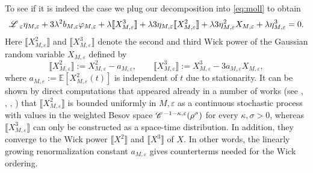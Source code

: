 \documentclass[a4paper,11pt]{article}
\newcommand{\assign}{:=}
\numberwithin{equation}{section}
\newcommand{\LL}{\mathscr{L} \hspace{.2em}}
\begin{document}
To see if it is indeed the case we plug our decomposition into
{\eqref{eq:moll}} to obtain
\begin{equation}
 \LL_{\varepsilon} \eta_{M, \varepsilon} + 3
  \lambda^2 b_{M, \varepsilon} \varphi_{M, \varepsilon} + \lambda \llbracket
  X_{M, \varepsilon}^3 \rrbracket + \lambda 3 \eta_{M, \varepsilon} \llbracket
  X_{M, \varepsilon}^2 \rrbracket + \lambda 3 \eta_{M, \varepsilon}^2 X_{M,
  \varepsilon} + \lambda \eta_{M, \varepsilon}^3 = 0. \label{eq:eta}
\end{equation}
Here $\llbracket X^2_{M, \varepsilon} \rrbracket$ and $\llbracket X^3_{M,
\varepsilon} \rrbracket$ denote the second and third Wick power of the
Gaussian random variable $X_{M, \varepsilon}$ defined by
\begin{equation}\label{eq:X2X3}
\llbracket X^2_{M, \varepsilon} \rrbracket \assign X^2_{M, \varepsilon} -
   a_{M, \varepsilon}, \qquad \llbracket X^3_{M, \varepsilon} \rrbracket
   \assign X^3_{M, \varepsilon} - 3 a_{M, \varepsilon} X_{M, \varepsilon},
   \end{equation}
where $a_{M, \varepsilon} \assign \mathbb{E} [X^2_{M, \varepsilon} (t)]$ is
independent of $t$ due to stationarity. It can be shown by direct computations
that appeared already in a number of works (see {\cite{CC}},
{\cite{hairer_theory_2014}}, {\cite{hairer_regularity_2015}},
{\cite{mourrat_construction_2016}}) that $\llbracket X^2_{M, \varepsilon}
\rrbracket$ is bounded
uniformly in $M, \varepsilon$ as a continuous stochastic process with values
in the weighted Besov space $\mathscr{C} \hspace{.1em}^{- 1 - \kappa,\varepsilon}
(\rho^{\sigma})$ for every $\kappa, \sigma > 0$, whereas  $\llbracket X^3_{M, \varepsilon} \rrbracket$ can only be constructed as a space-time distribution. In addition,
they converge to the Wick power $\llbracket X^2 \rrbracket$ and $\llbracket
X^3 \rrbracket$ of $X$. In other words, the
linearly growing renormalization constant $a_{M, \varepsilon}$ gives
counterterms needed for the Wick ordering.
\end{document}
